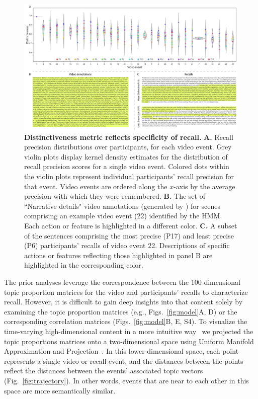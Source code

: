 \documentclass{article}
\newcommand{\corrmats}{S4}
\begin{document}
\begin{figure}[tp]
  \centering
  \includegraphics[width=1\textwidth]{figs/distinctiveness_detail}
  \caption{\small \textbf{Distinctiveness metric reflects specificity of recall.} \textbf{A.} Recall precision distributions over participants, for each video event.  Grey violin plots display kernel density estimates for the distribution of recall precision scores for a single video event.  Colored dots within the violin plots represent individual participants' recall precision for that event.  Video events are ordered along the $x$-axis by the average precision with which they were remembered.  \textbf{B.} The set of ``Narrative details" video annotations (generated by \citealp{ChenEtal17}) for scenes comprising an example video event (22) identified by the HMM.  Each action or feature is highlighted in a different color.  \textbf{C.} A subset of the sentences comprising the most precise (P17) and least precise (P6) participants' recalls of video event 22.  Descriptions of specific actions or features reflecting those highlighted in panel B are highlighted in the corresponding color.}
  \label{fig:distinctiveness-detail}
\end{figure}


The prior analyses leverage the correspondence between the 100-dimensional topic proportion matrices for the video and participants' recalls to characterize recall.  However, it is difficult to gain deep insights into that content solely by examining the topic proportion matrices (e.g., Figs.~\ref{fig:model}A, D) or the corresponding correlation matrices (Figs.~\ref{fig:model}B, E, \corrmats).  To visualize the time-varying high-dimensional content in a more intuitive way~\citep{HeusEtal18a} we projected the topic proportions matrices onto a two-dimensional space using Uniform Manifold Approximation and Projection~\citep[UMAP; ][]{McInEtal18}.  In this lower-dimensional space, each point represents a single video or recall event, and the distances between the points reflect the distances between the events' associated topic vectors (Fig.~\ref{fig:trajectory}). In other words, events that are near to each other in this space are more semantically similar.
\end{document}
